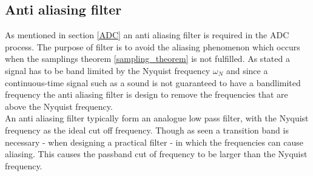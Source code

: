 \subsection{Anti aliasing filter}
As mentioned in section \ref{ADC} an anti aliasing filter is required in the ADC process. The purpose of filter is to avoid the aliasing phenomenon which occurs when the samplings theorem \ref{sampling_theorem} is not fulfilled. As stated a signal has to be band limited by the Nyquist frequency $\omega_N$ and since a continuous-time signal such as a sound is not guaranteed to have a bandlimited frequency the anti aliasing filter is design to remove the frequencies that are above the Nyquist frequency. \\
An anti aliasing filter typically form an analogue low pass filter, with the Nyquist frequency as the ideal cut off frequency. Though as seen a transition band is necessary - when designing a practical filter - in which the frequencies can cause aliasing. This causes the passband cut of frequency to be larger than the Nyquist frequency.           